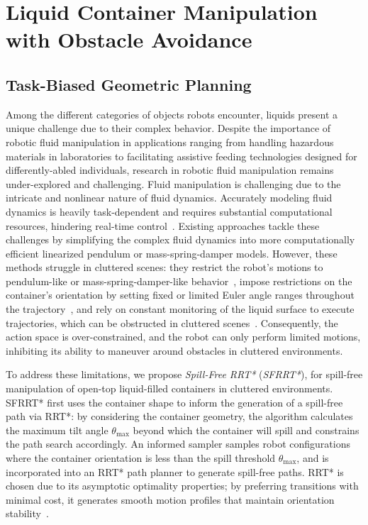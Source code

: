 \section{Liquid Container Manipulation with Obstacle Avoidance}
\label{sec:constrained:liquid}

\subsection{Task-Biased Geometric Planning}
\label{sec:constrained:biased}

Among the different categories of objects robots encounter, liquids present a unique challenge due to their complex behavior.
Despite the importance of robotic fluid manipulation in applications ranging from handling hazardous materials in laboratories to facilitating assistive feeding technologies designed for differently-abled individuals, research in robotic fluid manipulation remains under-explored and challenging.
Fluid manipulation is challenging due to the intricate and nonlinear nature of fluid dynamics.
Accurately modeling fluid dynamics is heavily task-dependent and requires substantial computational resources, hindering real-time control~\cite{systemstudy1, systemstudy2}.
Existing approaches tackle these challenges by simplifying the complex fluid dynamics into more computationally efficient linearized pendulum or mass-spring-damper models.
However, these methods struggle in cluttered scenes: they restrict the robot's motions to pendulum-like or mass-spring-damper-like behavior~\cite{pendulum2, pendulum2018, pendulum, springdamper2022, springdamper2021, pendulum2019}, impose restrictions on the container's orientation by setting fixed or limited Euler angle ranges throughout the trajectory~\cite{pendulum, springdamper2021}, and rely on constant monitoring of the liquid surface to execute trajectories, which can be obstructed in cluttered scenes~\cite{spill1, pendulum2019, montazeri2013chemical}.
Consequently, the action space is over-constrained, and the robot can only perform limited motions, inhibiting its ability to maneuver around obstacles in cluttered environments.

To address these limitations, we propose \emph{Spill-Free RRT*} (\textit{SFRRT*}), for spill-free manipulation of open-top liquid-filled containers in cluttered environments.
SFRRT* first uses the container shape to inform the generation of a spill-free path via RRT*: by considering the container geometry, the algorithm calculates the maximum tilt angle $\theta_{\max}$ beyond which the container will spill and constrains the path search accordingly.
An informed sampler samples robot configurations where the container orientation is less than the spill threshold $\theta_{\max}$, and is incorporated into an RRT* path planner to generate spill-free paths.
RRT* is chosen due to its asymptotic optimality properties; by preferring transitions with minimal cost, it generates smooth motion profiles that maintain orientation stability~\cite{rrt*}.

